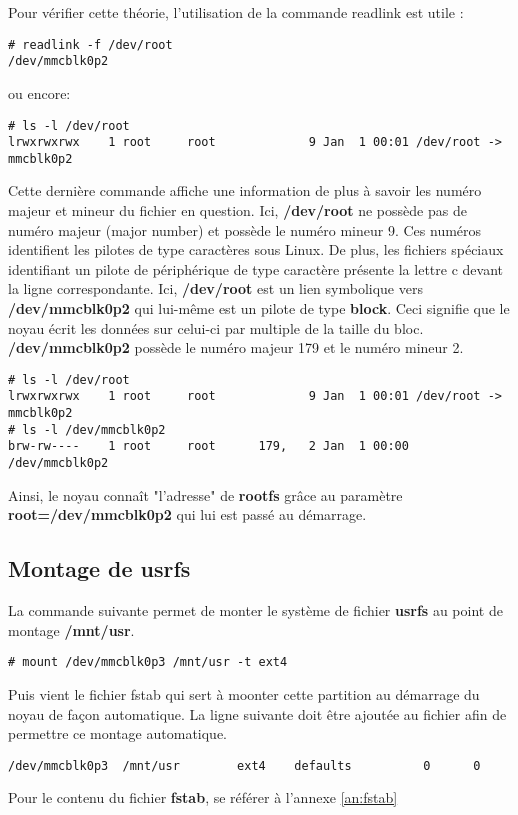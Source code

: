 Pour vérifier cette théorie, l'utilisation de la commande readlink est utile :
\begin{lstlisting}
# readlink -f /dev/root
/dev/mmcblk0p2
\end{lstlisting}
ou encore:
\begin{lstlisting}
# ls -l /dev/root
lrwxrwxrwx    1 root     root             9 Jan  1 00:01 /dev/root -> mmcblk0p2
\end{lstlisting}
Cette dernière commande affiche une information de plus à savoir les numéro majeur et mineur du fichier en question. Ici, \textbf{/dev/root} ne possède pas de numéro majeur (major number) et possède le numéro mineur 9. Ces numéros identifient les pilotes de type caractères sous Linux. De plus, les fichiers spéciaux identifiant un pilote de périphérique de type caractère présente la lettre c devant la ligne correspondante. Ici, \textbf{/dev/root} est un lien symbolique vers \textbf{/dev/mmcblk0p2} qui lui-même est un pilote de type \textbf{block}. Ceci signifie que le noyau écrit les données sur celui-ci par multiple de la taille du bloc. \textbf{/dev/mmcblk0p2} possède le numéro majeur 179 et le numéro mineur 2.
\begin{lstlisting}[style=Bash]
# ls -l /dev/root
lrwxrwxrwx    1 root     root             9 Jan  1 00:01 /dev/root -> mmcblk0p2
# ls -l /dev/mmcblk0p2
brw-rw----    1 root     root      179,   2 Jan  1 00:00 /dev/mmcblk0p2
\end{lstlisting}

Ainsi, le noyau connaît "l'adresse" de \textbf{rootfs} grâce au paramètre \textbf{root=/dev/mmcblk0p2} qui lui est passé au démarrage.

\subsection{Montage de usrfs}
La commande suivante permet de monter le système de fichier \textbf{usrfs} au point de montage \textbf{/mnt/usr}.
\begin{lstlisting}[style=Bash]
# mount /dev/mmcblk0p3 /mnt/usr -t ext4
\end{lstlisting}
Puis vient le fichier fstab qui sert à moonter cette partition au démarrage du noyau de façon automatique. La ligne suivante doit être ajoutée au fichier afin de permettre ce montage automatique.
\begin{lstlisting}
/dev/mmcblk0p3  /mnt/usr        ext4    defaults          0      0
\end{lstlisting}
Pour le contenu du fichier \textbf{fstab}, se référer à l'annexe \ref{an:fstab}

